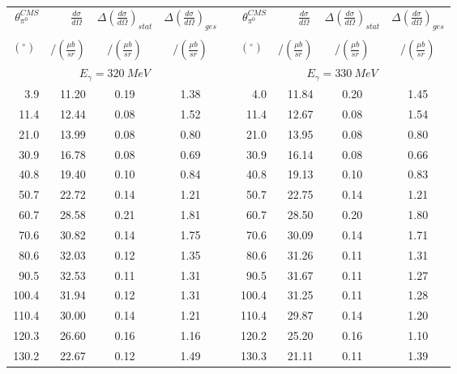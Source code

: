 \begin{table}[htbp] 
\begin{center} 
\begin{tabular}{|r|r|c|c|l|r|r|c|c|} 

\cline{1-4}
\cline{6-9} 
$\theta_{\pi^0}^{CMS}$ & 
$\displaystyle\frac{d\sigma}{d\Omega}\;$ & 
${\Delta}\left( \frac{d\sigma}{d\Omega}\right)_{stat}$ & 
${\Delta}\left( \frac{d\sigma}{d\Omega}\right)_{ges}$ & & 
$\theta_{\pi^0}^{CMS}$ & 
$\displaystyle\frac{d\sigma}{d\Omega}\;$ & 
${\Delta}\left( \frac{d\sigma}{d\Omega}\right)_{stat}$ & 
${\Delta}\left( \frac{d\sigma}{d\Omega}\right)_{ges}$ \\ 
& & & & & & & &\\ 
 $(^{\circ})\;$ & $/(\frac{{\mu}b}{sr})$ & $/(\frac{{\mu}b}{sr})$ & $/(\frac{{\mu}b}{sr})$ & & $(^{\circ})\;$ & $/(\frac{{\mu}b}{sr})$ & $/(\frac{{\mu}b}{sr})$ & $/(\frac{{\mu}b}{sr})$ \\ 
\cline{1-4} 
\cline{6-9} 
\multicolumn{4}{|c|}{ $E_{\gamma}=320~MeV$} & & 
\multicolumn{4}{c|}{ $E_{\gamma}=330~MeV$} \\ 
\cline{1-4} 
\cline{6-9} 
  3.9 & 11.20 &  0.19 &  1.38 & &   4.0 & 11.84 &  0.20 &  1.45 \\ 
 11.4 & 12.44 &  0.08 &  1.52 & &  11.4 & 12.67 &  0.08 &  1.54 \\ 
 21.0 & 13.99 &  0.08 &  0.80 & &  21.0 & 13.95 &  0.08 &  0.80 \\ 
 30.9 & 16.78 &  0.08 &  0.69 & &  30.9 & 16.14 &  0.08 &  0.66 \\ 
 40.8 & 19.40 &  0.10 &  0.84 & &  40.8 & 19.13 &  0.10 &  0.83 \\ 
 50.7 & 22.72 &  0.14 &  1.21 & &  50.7 & 22.75 &  0.14 &  1.21 \\ 
 60.7 & 28.58 &  0.21 &  1.81 & &  60.7 & 28.50 &  0.20 &  1.80 \\ 
 70.6 & 30.82 &  0.14 &  1.75 & &  70.6 & 30.09 &  0.14 &  1.71 \\ 
 80.6 & 32.03 &  0.12 &  1.35 & &  80.6 & 31.26 &  0.11 &  1.31 \\ 
 90.5 & 32.53 &  0.11 &  1.31 & &  90.5 & 31.67 &  0.11 &  1.27 \\ 
100.4 & 31.94 &  0.12 &  1.31 & & 100.4 & 31.25 &  0.11 &  1.28 \\ 
110.4 & 30.00 &  0.14 &  1.21 & & 110.4 & 29.87 &  0.14 &  1.20 \\ 
120.3 & 26.60 &  0.16 &  1.16 & & 120.2 & 25.20 &  0.16 &  1.10 \\ 
130.2 & 22.67 &  0.12 &  1.49 & & 130.3 & 21.11 &  0.11 &  1.39 \\ 

\end{tabular}
\end{center}
\end{table}
